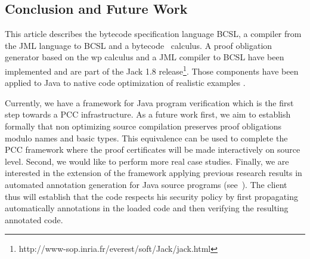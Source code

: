 \subsection{Conclusion and Future Work}\label{conclusion}
This article describes the bytecode specification language BCSL, a compiler from the JML language to BCSL and a bytecode \wpi \ calculus.
A proof obligation generator based on the wp calculus and a JML compiler to BCSL have been implemented and are part of the Jack 1.8 release\footnote{http://www-sop.inria.fr/everest/soft/Jack/jack.html}. Those components have been applied to Java to native code optimization of realistic examples \cite{CPG06LFN}.  


Currently, we have a framework for Java program verification which is the first step towards a PCC infrastructure.
 As a future work first, we aim to establish formally that non optimizing source compilation
preserves proof obligations modulo names and basic types. This equivalence can
 be used to complete the PCC framework where the proof certificates will be made interactively on source level. Second, we would like to perform more real case studies. 
Finally, we are interested in 
the extension of the framework applying previous research results in automated annotation generation for Java source programs (see~\cite{m+04:cardis}). The client thus will establish that the code respects his security policy %
by first propagating automatically annotations in the loaded code and then verifying the resulting annotated code.





